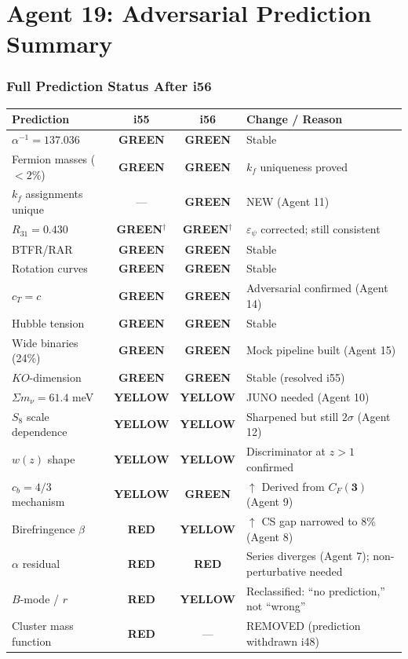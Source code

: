 \documentclass[11pt,a4paper]{article}
\newcommand{\GREEN}{\textcolor{dfdgreen}{\textbf{GREEN}}}
\newcommand{\YELLOW}{\textcolor{dfdyellow}{\textbf{YELLOW}}}
\newcommand{\RED}{\textcolor{dfdred}{\textbf{RED}}}
\begin{document}
\part{Agent 19: Adversarial Prediction Summary}
\label{part:adversarial-summary}

\section{Full Prediction Status After i56}

\begin{center}
\begin{longtable}{p{4.5cm}ccp{5cm}}
\toprule
\textbf{Prediction} & \textbf{i55} & \textbf{i56} & \textbf{Change / Reason} \\
\midrule
$\alpha^{-1} = 137.036$ & \GREEN & \GREEN & Stable \\
Fermion masses ($< 2\%$) & \GREEN & \GREEN & $k_f$ uniqueness proved \\
$k_f$ assignments unique & --- & \GREEN & NEW (Agent 11) \\
$R_{31} = 0.430$ & \GREEN$^\dagger$ & \GREEN$^\dagger$ & $\varepsilon_\psi$ corrected; still consistent \\
BTFR/RAR & \GREEN & \GREEN & Stable \\
Rotation curves & \GREEN & \GREEN & Stable \\
$c_T = c$ & \GREEN & \GREEN & Adversarial confirmed (Agent 14) \\
Hubble tension & \GREEN & \GREEN & Stable \\
Wide binaries (24\%) & \GREEN & \GREEN & Mock pipeline built (Agent 15) \\
$KO$-dimension & \GREEN & \GREEN & Stable (resolved i55) \\
$\Sigma m_\nu = 61.4$ meV & \YELLOW & \YELLOW & JUNO needed (Agent 10) \\
$S_8$ scale dependence & \YELLOW & \YELLOW & Sharpened but still $2\sigma$ (Agent 12) \\
$w(z)$ shape & \YELLOW & \YELLOW & Discriminator at $z > 1$ confirmed \\
$c_b = 4/3$ mechanism & \YELLOW & \GREEN & $\uparrow$ Derived from $C_F(\mathbf{3})$ (Agent 9) \\
Birefringence $\beta$ & \RED & \YELLOW & $\uparrow$ CS gap narrowed to $8\%$ (Agent 8) \\
$\alpha$ residual & \RED & \RED & Series diverges (Agent 7); non-perturbative needed \\
$B$-mode / $r$ & \RED & \YELLOW & Reclassified: ``no prediction,'' not ``wrong'' \\
Cluster mass function & \RED & --- & REMOVED (prediction withdrawn i48) \\
\bottomrule
\end{longtable}
\end{center}
\end{document}
